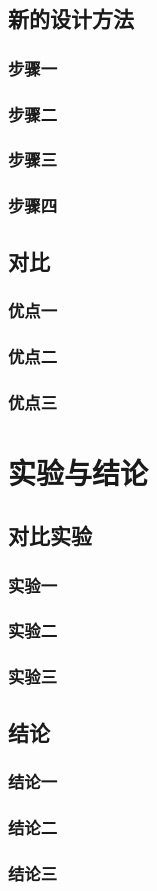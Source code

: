 \subsection{新的设计方法}
\subsubsection{步骤一}
\subsubsection{步骤二}
\subsubsection{步骤三}
\subsubsection{步骤四}

\subsection{对比}
\subsubsection{优点一}
\subsubsection{优点二}
\subsubsection{优点三}

\section{实验与结论}
\subsection{对比实验}
\subsubsection{实验一}
\subsubsection{实验二}
\subsubsection{实验三}
\subsection{结论}
\subsubsection{结论一}
\subsubsection{结论二}
\subsubsection{结论三}